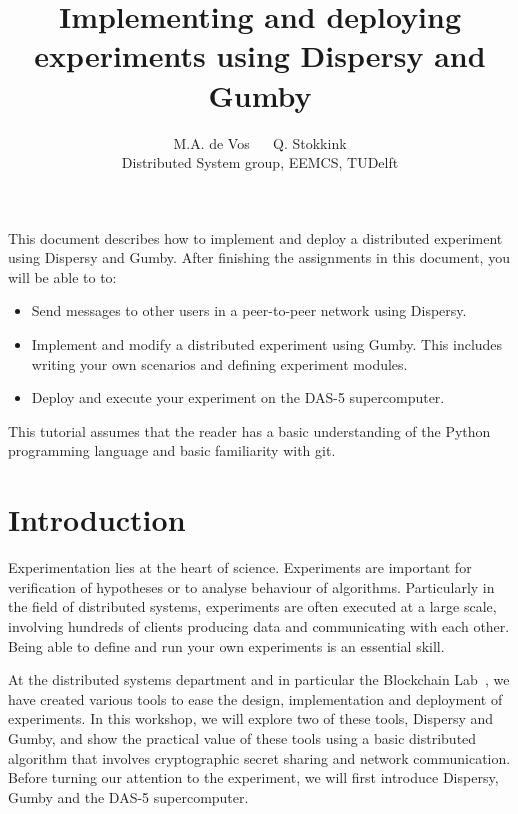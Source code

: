 \documentclass{article}
\author{
  M.A. de Vos $\quad$
  Q. Stokkink\\
  \small Distributed System group, EEMCS, TUDelft
}
\title{Implementing and deploying experiments using Dispersy and Gumby}
\begin{document}
\maketitle

This document describes how to implement and deploy a distributed experiment using Dispersy and Gumby.
After finishing the assignments in this document, you will be able to to:
\begin{itemize}
	\item Send messages to other users in a peer-to-peer network using Dispersy.
	\item Implement and modify a distributed experiment using Gumby. This includes writing your own scenarios and defining experiment modules.
	\item Deploy and execute your experiment on the DAS-5 supercomputer.
\end{itemize}

This tutorial assumes that the reader has a basic understanding of the Python programming language and basic familiarity with git.

\section{Introduction}
Experimentation lies at the heart of science. Experiments are important for verification of hypotheses or to analyse behaviour of algorithms.
Particularly in the field of distributed systems, experiments are often executed at a large scale, involving hundreds of clients producing data and communicating with each other.
Being able to define and run your own experiments is an essential skill.

At the distributed systems department and in particular the Blockchain Lab~\cite{blockchainlab}, we have created various tools to ease the design, implementation and deployment of experiments. In this workshop, we will explore two of these tools, Dispersy and Gumby, and show the practical value of these tools using a basic distributed algorithm that involves cryptographic secret sharing and network communication.
Before turning our attention to the experiment, we will first introduce Dispersy, Gumby and the DAS-5 supercomputer.
\end{document}
